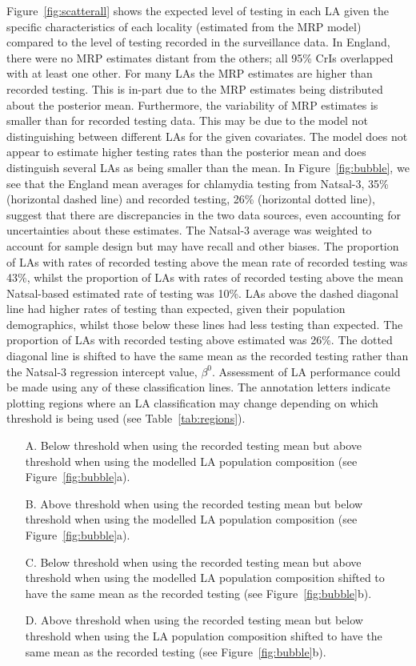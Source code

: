 \documentclass[fleqn,10pt]{wlscirep}
\begin{document}
Figure~\ref{fig:scatterall} shows the expected level of testing in each LA given the specific characteristics of each locality (estimated from the MRP model) compared to the level of testing recorded in the surveillance data. In England, there were no MRP estimates distant from the others; all 95\% CrIs overlapped with at least one other. For many LAs the MRP estimates are higher than recorded testing. This is in-part due to the MRP estimates being distributed about the posterior mean. Furthermore, the variability of MRP estimates is smaller than for recorded testing data. This may be due to the model not distinguishing between different LAs for the given covariates. The model does not appear to estimate higher testing rates than the posterior mean and does distinguish several LAs as being smaller than the mean. In Figure~\ref{fig:bubble}, we see that the England mean averages for chlamydia testing from Natsal-3, 35\% (horizontal dashed line) and recorded testing, 26\% (horizontal dotted line), suggest that there are discrepancies in the two data sources, even accounting for uncertainties about these estimates. The Natsal-3 average was weighted to account for sample design but may have recall and other biases. The proportion of LAs with rates of recorded testing above the mean rate of recorded testing was 43\%, whilst the proportion of LAs with rates of recorded testing above the mean Natsal-based estimated rate of testing was 10\%. LAs above the dashed diagonal line had higher rates of testing than expected, given their population demographics, whilst those below these lines had less testing than expected. The proportion of LAs with recorded testing above estimated was 26\%. 
The dotted diagonal line is shifted to have the same mean as the recorded testing rather than the Natsal-3 regression intercept value, $\beta^0$. Assessment of LA performance could be made using any of these classification lines. 
The annotation letters indicate plotting regions where an LA classification may change depending on which threshold is being used (see Table~\ref{tab:regions}).
\begin{itemize}
\item[A.]	Below threshold when using the recorded testing mean but above threshold when using the modelled LA population composition (see Figure~\ref{fig:bubble}a).
\item[B.]	Above threshold when using the recorded testing mean but below threshold when using the modelled LA population composition (see Figure~\ref{fig:bubble}a).
\item[C.]	Below threshold when using the recorded testing mean but above threshold when using the modelled LA population composition shifted to have the same mean as the recorded testing (see Figure~\ref{fig:bubble}b).
\item[D.]	Above threshold when using the recorded testing mean but below threshold when using the LA population composition shifted to have the same mean as the recorded testing (see Figure~\ref{fig:bubble}b).
\end{itemize}
\end{document}
